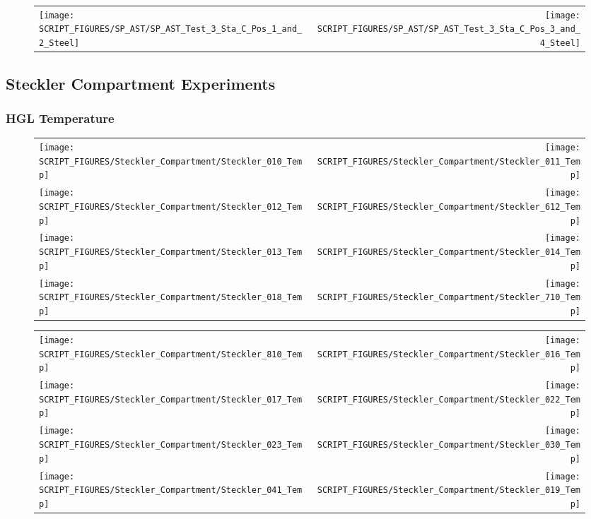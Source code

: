 \begin{figure}[!ht]
\begin{tabular*}{\textwidth}{l@{\extracolsep{\fill}}r}
\texttt{[image: SCRIPT\_FIGURES/SP\_AST/SP\_AST\_Test\_3\_Sta\_C\_Pos\_1\_and\_2\_Steel]} &
\texttt{[image: SCRIPT\_FIGURES/SP\_AST/SP\_AST\_Test\_3\_Sta\_C\_Pos\_3\_and\_4\_Steel]}
\end{tabular*}
\end{figure}

\clearpage

\subsection{Steckler Compartment Experiments}

\subsubsection{HGL Temperature}

\begin{figure}[!ht]
\begin{tabular*}{\textwidth}{l@{\extracolsep{\fill}}r}
\texttt{[image: SCRIPT\_FIGURES/Steckler\_Compartment/Steckler\_010\_Temp]} &
\texttt{[image: SCRIPT\_FIGURES/Steckler\_Compartment/Steckler\_011\_Temp]} \\
\texttt{[image: SCRIPT\_FIGURES/Steckler\_Compartment/Steckler\_012\_Temp]} &
\texttt{[image: SCRIPT\_FIGURES/Steckler\_Compartment/Steckler\_612\_Temp]} \\
\texttt{[image: SCRIPT\_FIGURES/Steckler\_Compartment/Steckler\_013\_Temp]} &
\texttt{[image: SCRIPT\_FIGURES/Steckler\_Compartment/Steckler\_014\_Temp]} \\
\texttt{[image: SCRIPT\_FIGURES/Steckler\_Compartment/Steckler\_018\_Temp]} &
\texttt{[image: SCRIPT\_FIGURES/Steckler\_Compartment/Steckler\_710\_Temp]}
\end{tabular*}
\end{figure}

\begin{figure}[!ht]
\begin{tabular*}{\textwidth}{l@{\extracolsep{\fill}}r}
\texttt{[image: SCRIPT\_FIGURES/Steckler\_Compartment/Steckler\_810\_Temp]} &
\texttt{[image: SCRIPT\_FIGURES/Steckler\_Compartment/Steckler\_016\_Temp]} \\
\texttt{[image: SCRIPT\_FIGURES/Steckler\_Compartment/Steckler\_017\_Temp]} &
\texttt{[image: SCRIPT\_FIGURES/Steckler\_Compartment/Steckler\_022\_Temp]} \\
\texttt{[image: SCRIPT\_FIGURES/Steckler\_Compartment/Steckler\_023\_Temp]} &
\texttt{[image: SCRIPT\_FIGURES/Steckler\_Compartment/Steckler\_030\_Temp]} \\
\texttt{[image: SCRIPT\_FIGURES/Steckler\_Compartment/Steckler\_041\_Temp]} &
\texttt{[image: SCRIPT\_FIGURES/Steckler\_Compartment/Steckler\_019\_Temp]}
\end{tabular*}
\end{figure}

